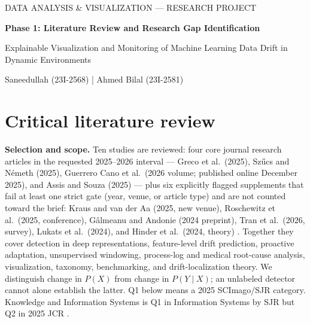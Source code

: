 \documentclass[10pt,a4paper]{article}
\begin{document}
\begin{center}
{\small DATA ANALYSIS \& VISUALIZATION --- RESEARCH PROJECT}\par
{\Large\bfseries Phase 1: Literature Review and Research Gap Identification}\par
Explainable Visualization and Monitoring of Machine Learning Data Drift in Dynamic Environments\par
{\small Saneedullah (23I-2568) \quad | \quad Ahmed Bilal (23I-2581)}
\end{center}
\vspace{-5pt}
\section*{Critical literature review}
\textbf{Selection and scope.} Ten studies are reviewed: four core journal research articles in the requested 2025--2026 interval --- Greco et al.\ (2025), Sz\H{u}cs and N\'emeth (2025), Guerrero Cano et al.\ (2026 volume; published online December 2025), and Assis and Souza (2025) \cite{greco,szucs,guerrero,assisu} --- plus six explicitly flagged supplements that fail at least one strict gate (year, venue, or article type) and are not counted toward the brief: Kraus and van der Aa (2025, new venue), Roschewitz et al.\ (2025, conference), G\^almeanu and Andonie (2024 preprint), Tran et al.\ (2026, survey), Lukats et al.\ (2024), and Hinder et al.\ (2024, theory) \cite{kraus,roschewitz,galmeanu,tran,lukats,hinderB}. Together they cover detection in deep representations, feature-level drift prediction, proactive adaptation, unsupervised windowing, process-log and medical root-cause analysis, visualization, taxonomy, benchmarking, and drift-localization theory. We distinguish change in $P(X)$ from change in $P(Y\mid X)$; an unlabeled detector cannot alone establish the latter. Q1 below means a 2025 SCImago/SJR category. Knowledge and Information Systems is Q1 in Information Systems by SJR but Q2 in 2025 JCR \cite{ranking}.
\end{document}
